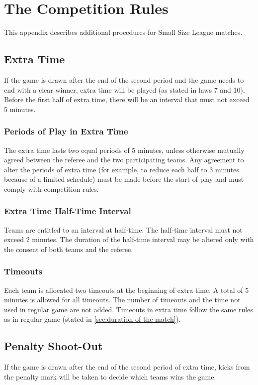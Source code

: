 \section{The Competition Rules}\label{app:competition-rules}

This appendix describes additional procedures for Small Size League matches.

\subsection{Extra Time}
If the game is drawn after the end of the second period and the game needs to end with a clear winner, extra time will be played (as stated in laws 7 and 10).
Before the first half of extra time, there will be an interval that must not exceed 5 minutes.

\subsubsection{Periods of Play in Extra Time}
The extra time lasts two equal periods of 5 minutes, unless otherwise mutually agreed between the referee and the two participating teams.
Any agreement to alter the periods of extra time (for example, to reduce each half to 3 minutes because of a limited schedule) must be made before the start of play and must comply with competition rules.

\subsubsection{Extra Time Half-Time Interval}
Teams are entitled to an interval at half-time.
The half-time interval must not exceed 2 minutes.
The duration of the half-time interval may be altered only with the consent of both teams and the referee.

\subsubsection{Timeouts}
Each team is allocated two timeouts at the beginning of extra time.
A total of 5 minutes is allowed for all timeouts.
The number of timeouts and the time not used in regular game are not added.
Timeouts in extra time follow the same rules as in regular game (stated in \autoref{sec:duration-of-the-match}).

\subsection{Penalty Shoot-Out}
If the game is drawn after the end of the second period of extra time, kicks from the penalty mark will be taken to decide which teams wins the game.



